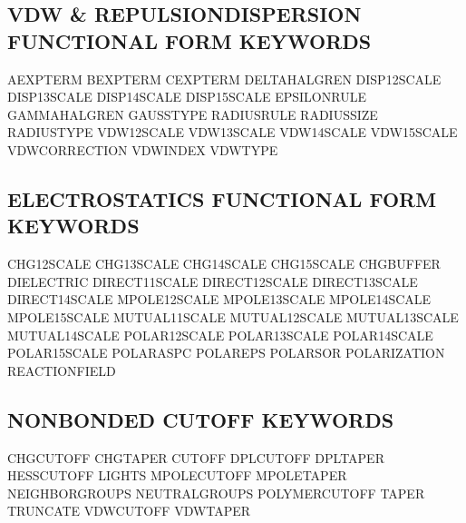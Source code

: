 \documentclass[letterpaper,11pt,english]{sphinxmanual}
\begin{document}
\subsection{VDW \& REPULSION\sphinxhyphen{}DISPERSION FUNCTIONAL FORM KEYWORDS}
\label{\detokenize{text/keywords:vdw-repulsion-dispersion-functional-form-keywords}}
A\sphinxhyphen{}EXPTERM       B\sphinxhyphen{}EXPTERM       C\sphinxhyphen{}EXPTERM
DELTA\sphinxhyphen{}HALGREN   DISP\sphinxhyphen{}12\sphinxhyphen{}SCALE   DISP\sphinxhyphen{}13\sphinxhyphen{}SCALE
DISP\sphinxhyphen{}14\sphinxhyphen{}SCALE   DISP\sphinxhyphen{}15\sphinxhyphen{}SCALE   EPSILONRULE
GAMMA\sphinxhyphen{}HALGREN   GAUSSTYPE       RADIUSRULE
RADIUSSIZE      RADIUSTYPE      VDW\sphinxhyphen{}12\sphinxhyphen{}SCALE
VDW\sphinxhyphen{}13\sphinxhyphen{}SCALE    VDW\sphinxhyphen{}14\sphinxhyphen{}SCALE    VDW\sphinxhyphen{}15\sphinxhyphen{}SCALE
VDW\sphinxhyphen{}CORRECTION  VDWINDEX        VDWTYPE


\subsection{ELECTROSTATICS FUNCTIONAL FORM KEYWORDS}
\label{\detokenize{text/keywords:electrostatics-functional-form-keywords}}
CHG\sphinxhyphen{}12\sphinxhyphen{}SCALE    CHG\sphinxhyphen{}13\sphinxhyphen{}SCALE    CHG\sphinxhyphen{}14\sphinxhyphen{}SCALE
CHG\sphinxhyphen{}15\sphinxhyphen{}SCALE    CHG\sphinxhyphen{}BUFFER      DIELECTRIC
DIRECT\sphinxhyphen{}11\sphinxhyphen{}SCALE DIRECT\sphinxhyphen{}12\sphinxhyphen{}SCALE DIRECT\sphinxhyphen{}13\sphinxhyphen{}SCALE
DIRECT\sphinxhyphen{}14\sphinxhyphen{}SCALE MPOLE\sphinxhyphen{}12\sphinxhyphen{}SCALE  MPOLE\sphinxhyphen{}13\sphinxhyphen{}SCALE
MPOLE\sphinxhyphen{}14\sphinxhyphen{}SCALE  MPOLE\sphinxhyphen{}15\sphinxhyphen{}SCALE  MUTUAL\sphinxhyphen{}11\sphinxhyphen{}SCALE
MUTUAL\sphinxhyphen{}12\sphinxhyphen{}SCALE MUTUAL\sphinxhyphen{}13\sphinxhyphen{}SCALE MUTUAL\sphinxhyphen{}14\sphinxhyphen{}SCALE
POLAR\sphinxhyphen{}12\sphinxhyphen{}SCALE  POLAR\sphinxhyphen{}13\sphinxhyphen{}SCALE  POLAR\sphinxhyphen{}14\sphinxhyphen{}SCALE
POLAR\sphinxhyphen{}15\sphinxhyphen{}SCALE  POLAR\sphinxhyphen{}ASPC      POLAR\sphinxhyphen{}EPS
POLAR\sphinxhyphen{}SOR       POLARIZATION    REACTIONFIELD


\subsection{NONBONDED CUTOFF KEYWORDS}
\label{\detokenize{text/keywords:nonbonded-cutoff-keywords}}
CHG\sphinxhyphen{}CUTOFF      CHG\sphinxhyphen{}TAPER       CUTOFF
DPL\sphinxhyphen{}CUTOFF      DPL\sphinxhyphen{}TAPER       HESS\sphinxhyphen{}CUTOFF
LIGHTS  MPOLE\sphinxhyphen{}CUTOFF    MPOLE\sphinxhyphen{}TAPER
NEIGHBOR\sphinxhyphen{}GROUPS NEUTRAL\sphinxhyphen{}GROUPS  POLYMER\sphinxhyphen{}CUTOFF
TAPER   TRUNCATE        VDW\sphinxhyphen{}CUTOFF
VDW\sphinxhyphen{}TAPER
\end{document}
